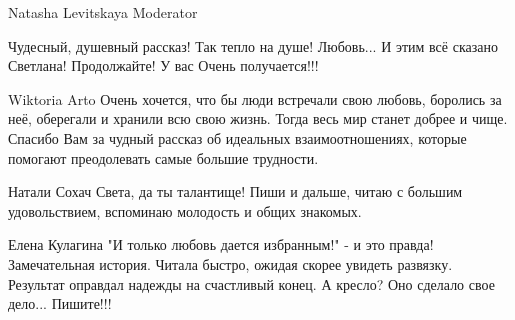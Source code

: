 Natasha Levitskaya
Moderator

Чудесный, душевный рассказ! Так тепло на душе! Любовь... И этим всё сказано Светлана! Продолжайте! У вас Очень получается!!!

Wiktoria Arto
Очень хочется, что бы люди встречали свою любовь, боролись за неё, оберегали и хранили всю свою жизнь. Тогда весь мир станет добрее и чище. Спасибо Вам за чудный рассказ об идеальных взаимоотношениях, которые помогают преодолевать самые большие трудности.

Натали Сохач
Света, да ты талантище! Пиши и дальше, читаю с большим удовольствием, вспоминаю молодость и общих знакомых.

Елена Кулагина
"И только любовь дается избранным!" - и это правда! Замечательная история. Читала быстро, ожидая скорее увидеть развязку. Результат оправдал надежды на счастливый конец. А кресло? Оно сделало свое дело... Пишите!!!
